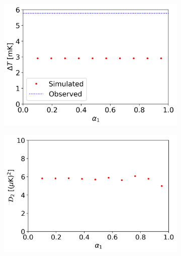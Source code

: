 \documentclass[a4paper,12pt]{report}
\begin{document}
\begin{figure}[tb]
    \centering
    \begin{subfigure}[b]{0.45\textwidth}
        \centering
        \includegraphics[width=\textwidth]{two structures/COMP only MCMC/0.5 quantile/varying alpha_1/CMB Dipole varying alpha_1.png}
        \caption{}
    \end{subfigure}
    \hfill
    \begin{subfigure}[b]{0.45\textwidth}
        \centering
        \includegraphics[width=\textwidth]{two structures/COMP only MCMC/0.5 quantile/varying alpha_1/CMB quadrupole varying alpha_1.png}
        \caption{}
    \end{subfigure}
    \\
    \begin{subfigure}[b]{0.45\textwidth}
        \centering

\end{subfigure}
\end{figure}
\end{document}
